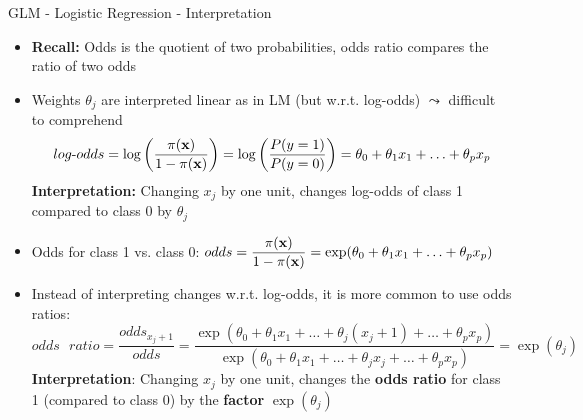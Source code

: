 \documentclass[11pt,compress,t,notes=noshow, aspectratio=169, xcolor=table]{beamer}
\begin{document}
\begin{frame}[c]{GLM - Logistic Regression - Interpretation}

    \begin{itemize}
        \item \textbf{Recall:} Odds is the quotient of two probabilities, odds ratio compares the ratio of two odds 
        \item Weights $\theta_j$ are interpreted linear as in LM (but w.r.t. log-odds) $\leadsto$ difficult to comprehend
        $$log\text{-}odds = \log \left(\frac{\pi(\xv)}{1 - \pi(\xv)}\right) = \log \left(\frac{P(y=1)}{P(y=0)}\right) = \theta_0 + \theta_1 x_1 + \ldots + \theta_p x_p  $$
        \textbf{Interpretation:} Changing $x_j$ by one unit, changes log-odds of class 1 compared to class 0 by $\theta_j$%
        \pause
        \item Odds for class 1 vs. class 0: %
        $odds = \displaystyle\frac{\pi(\xv)}{1 - \pi(\xv)}= \exp(\theta_0 + \theta_1 x_1 + \ldots + \theta_p x_p)$
        \item Instead of interpreting changes w.r.t. log-odds, it is more common to use odds ratios:
        $$odds\text{ }ratio = \frac{odds_{x_j+1}}{odds} = \frac{\exp(\theta_0 + \theta_1 x_1 + \ldots + \theta_j (x_j+1) + \ldots + \theta_p x_p)}{\exp(\theta_0 + \theta_1 x_1 + \ldots + \theta_j x_j + \ldots + \theta_p x_p)} = \exp{(\theta_j)} $$
        \textbf{Interpretation}: Changing $x_j$ by one unit, changes the \textbf{odds ratio} for class 1 (compared to class 0) by the \textbf{factor} $\exp(\theta_j)$
    \end{itemize}	

\end{frame}
\end{document}
